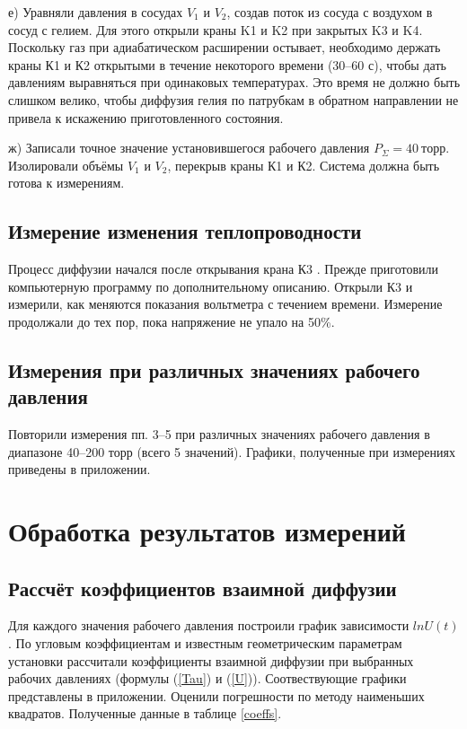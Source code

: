 \documentclass[a4paper, 12pt]{article}
\begin{document}
        е) Уравняли давления в сосудах $V_1$ и $V_2$, создав поток из сосуда с воздухом в сосуд с гелием. Для этого открыли краны K1 и K2 при закрытых K3 и K4. Поскольку газ при адиабатическом расширении остывает, необходимо держать краны К1 и К2 открытыми в течение некоторого времени (30–60 с), чтобы дать давлениям выравняться при одинаковых температурах. Это время не должно быть слишком велико, чтобы диффузия гелия по патрубкам в обратном направлении не привела к искажению приготовленного состояния.

        ж) Записали точное значение установившегося рабочего давления $P_{\Sigma} = 40~торр$. Изолировали объёмы $V_1$ и $V_2$, перекрыв краны К1 и К2. Система должна быть готова к измерениям.

    \subsection{Измерение изменения теплопроводности}

        Процесс диффузии начался после открывания крана К3 . Прежде приготовили компьютерную программу по дополнительному описанию. Открыли К3 и измерили, как меняются показания вольтметра с течением времени. Измерение продолжали до тех пор, пока напряжение не упало на 50\%.

    \subsection{Измерения при различных значениях рабочего давления}

        Повторили измерения пп. 3–5 при различных значениях рабочего давления в диапазоне 40–200 торр (всего 5 значений). Графики, полученные при измерениях приведены в приложении.

    \section{Обработка результатов измерений}

    \subsection{Рассчёт коэффициентов взаимной диффузии}

        Для каждого значения рабочего давления построили график зависимости $lnU(t)$.  По угловым коэффициентам и известным геометрическим параметрам установки рассчитали коэффициенты взаимной диффузии при выбранных рабочих давлениях (формулы (\ref{Tau}) и (\ref{U})). Соотвествующие графики представлены в приложении. Оценили погрешности по методу наименьших квадратов. Полученные данные в таблице \ref{coeffs}.
\end{document}
